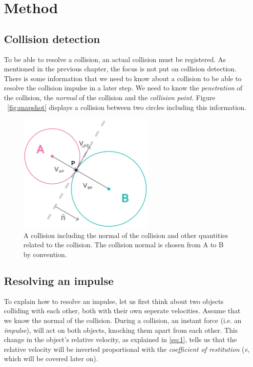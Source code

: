 \documentclass[a4paper,12pt]{report}
\begin{document}
\chapter{Method}

\section{Collision detection}

To be able to resolve a collision, an actual collision must be registered. As mentioned in the previous chapter, the focus is not put on collision detection. There is some information that we need to know about a collision to be able to resolve the collision impulse in a later step. We need to know the \emph{penetration} of the collision, the \emph{normal} of the collision and the \emph{collision point}. Figure ~\ref{fig:snapshot} displays a collision between two circles including this information.

\begin{figure}[!ht]
    \centering
    \includegraphics[width=0.6\textwidth]{figures/collision.png}
    \caption{A collision including the normal of the collision and other quantities related to the collision. The collision normal is chosen from A to B by convention.}
    \label{fig:collision}
\end{figure}

\section{Resolving an impulse}

To explain how to resolve an impulse\cite{gdm}, let us first think about two objects colliding with each other, both with their own seperate velocities. Assume that we know the normal of the collision. During a collision, an instant force (i.e. an \emph{impulse}), will act on both objects, knocking them apart from each other. This change in the object's relative velocity, as explained in \ref{eq:1}, tells us that the relative velocity will be inverted proportional with the \emph{coefficient of restitution} (\emph{e}, which will be covered later on).
\end{document}
